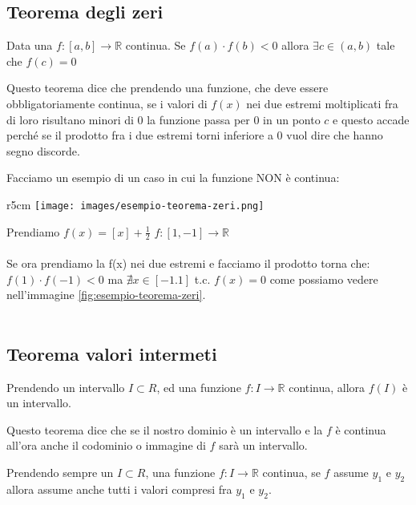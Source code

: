 \subsection{Teorema degli zeri}
\begin{theorem}
    Data una $f: [a, b] \longrightarrow \mathbb{R}$ continua. Se $f(a) \cdot f(b) < 0$ allora $\exists c \in (a, b)$ tale che $f(c) = 0$
\end{theorem}
Questo teorema dice che prendendo una funzione, che deve essere obbligatoriamente continua, se i valori di $f(x)$ nei due estremi moltiplicati fra di loro risultano minori di 0 la funzione passa per 0 in un ponto $c$ e questo accade perché se il prodotto fra i due estremi torni inferiore a 0 vuol dire che hanno segno discorde.\\
\begin{example}
    Facciamo un esempio di un caso in cui la funzione NON è continua:
\end{example}
\begin{wrapfigure}{r}{5cm}
    \vspace{-10pt}
    \centering
    \texttt{[image: images/esempio-teorema-zeri.png]}
    \caption{$f(x) = [x] + \frac{1}{2}$}
    \label{fig:esempio-teorema-zeri}
\end{wrapfigure}
Prendiamo $f(x) = [x] + \frac{1}{2}$ \: $f: [1, -1] \longrightarrow \mathbb{R}$\\ \\
Se ora prendiamo la f(x) nei due estremi e facciamo il prodotto torna che: \\
$f(1) \cdot f(-1) < 0$ ma $\nexists x \in [-1.1]$ t.c. $f(x) = 0$ come possiamo vedere nell'immagine \ref{fig:esempio-teorema-zeri}.\\ \\

\subsection{Teorema valori intermeti}
\begin{theorem}
    Prendendo un intervallo $I \subset R$, ed una funzione $f: I \longrightarrow \mathbb{R}$ continua, allora $f(I)$ è un intervallo.
\end{theorem}
Questo teorema dice che se il nostro dominio è un intervallo e la $f$ è continua all'ora anche il codominio o immagine di $f$ sarà un intervallo.
\begin{corollaries}
    Prendendo sempre un $I \subset R$, una funzione $f: I \longrightarrow \mathbb{R}$ continua, se $f$ assume $y_1$ e $y_2$ allora assume anche tutti i valori compresi fra $y_1$ e $y_2$.
\end{corollaries}

